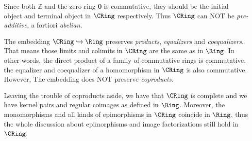   Since both $\mathbb{Z}$ and the zero ring $\mathbf{0}$ is commutative, they should be the initial object and terminal object in $\CRing$ respectively. Thus $\CRing$ can NOT be \emph{pre-additive}, a fortiori \emph{abelian}.

  The embedding $\CRing\hookrightarrow\Ring$ preserves \emph{products}, \emph{equalizers} and \emph{coequalizers}. That means those limits and colimits in $\CRing$ are the same as in $\Ring$. In other words, the direct product of a family of commutative rings is commutative, the equalizer and coequalizer of a homomorphism in $\CRing$ is also commutative. However, The embedding does NOT preserve \emph{coproducts}.

  Leaving the trouble of coproducts aside, we have that $\CRing$ is complete and we have kernel pairs and regular coimages as defined in $\Ring$.
  Moreover, the monomorphisms and all kinds of epimorphisms in $\CRing$ coincide in $\Ring$, thus the whole discussion about epimorphisms and image factorizations still hold in $\CRing$.












